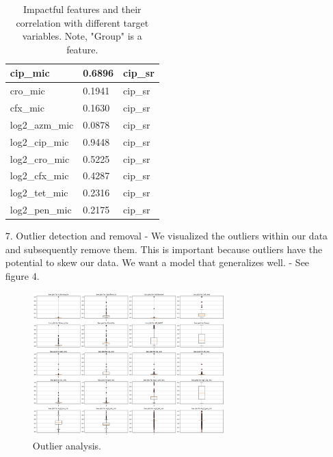 \documentclass[manuscript,screen,review, nonacm]{acmart}
\begin{document}
\begin{itemize}
\begin{table}[H]
\begin{tabular}{|l|l|l|}
                cip\_mic                   & 0.6896               & cip\_sr         \\ \hline
                cro\_mic                   & 0.1941               & cip\_sr         \\ \hline
                cfx\_mic                   & 0.1630               & cip\_sr         \\ \hline
                log2\_azm\_mic             & 0.0878               & cip\_sr         \\ \hline
                log2\_cip\_mic             & 0.9448               & cip\_sr         \\ \hline
                log2\_cro\_mic             & 0.5225               & cip\_sr         \\ \hline
                log2\_cfx\_mic             & 0.4287               & cip\_sr         \\ \hline
                log2\_tet\_mic             & 0.2316               & cip\_sr         \\ \hline
                log2\_pen\_mic             & 0.2175               & cip\_sr         \\ \hline
                \end{tabular}
                \caption{Impactful features and their correlation with different target variables. Note, "Group" is a feature.}
            \end{table}

    \item[7.] Outlier detection and removal - We visualized the outliers within our data and subsequently remove them. This is important because outliers
    have the potential to skew our data. We want a model that generalizes well. - See figure 4.
            \begin{figure}[H]
                \centering
                \vspace{-10pt}
                \includegraphics[width=0.7\textwidth]{figures/outlier.png}
                \caption{Outlier analysis.}
                \vspace{-10pt}
            \end{figure}
        



\end{itemize}
\end{document}
